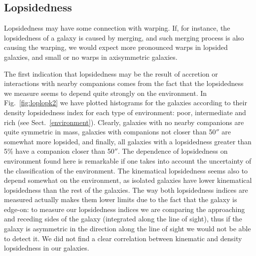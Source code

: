 \documentclass{aa}
\newcounter{dummyfofo}
\begin{document}
\subsection{Lopsidedness}

Lopsidedness may have some connection with warping. If, for instance, the lopsidedness
of a galaxy is caused by merging, and such merging process is also
causing the warping, we would expect more pronounced warps in lopsided
galaxies, and small or no warps in axisymmetric galaxies. 

The first indication that
lopsidedness may be the result of accretion or 
interactions with nearby companions comes from the fact that the lopsidedness
we measure seems to depend quite strongly on the
environment. In Fig.~\ref{fig:loplopk2} we have plotted histograms
for the galaxies according to their density lopsidedness index for
each type of environment: poor, intermediate and rich (see 
Sect.~\ref{environment}). Clearly, galaxies with no nearby companions
are quite symmetric in mass, galaxies with companions not closer
than 50$''$ are somewhat more lopsided, and finally, all galaxies with
a lopsidedness greater than 5\% have a companion closer than 50$''$. The
dependence of lopsidedness on environment found here is
remarkable if one takes into account the uncertainty of the 
classification of the environment. The kinematical lopsidedness seems also
to depend somewhat on the environment, as
isolated galaxies have lower kinematical lopsidedness than the rest of
the galaxies. The way both
lopsidedness indices are measured actually makes 
them lower limits due to the fact that the galaxy is edge-on: to
measure our lopsidedness indices we are comparing the approaching and receding
sides of the galaxy (integrated along the line of sight), thus if the
galaxy is asymmetric in the direction along the line of sight we would
not be able to detect it. We did not find a clear correlation between
kinematic and density lopsidedness in our galaxies.

\setcounter{dummyfofo}{\thefigure}
\end{document}
